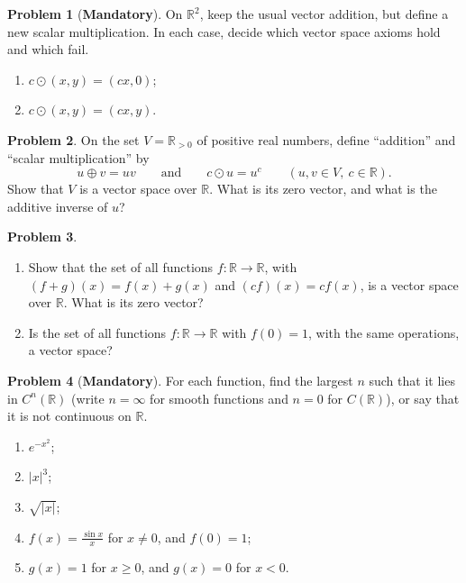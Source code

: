 \documentclass[11pt]{article}
\theoremstyle{definition}
\newtheorem{problem}{Problem}[section]
\newcommand{\mandatory}{\textcolor{red!70!black}{\textbf{Mandatory}}}
\begin{document}
\begin{problem}[\mandatory]\label{pr:weird-ops}
    On $\mathbb{R}^2$, keep the usual vector addition, but define a new scalar multiplication. In each case, decide which vector space axioms hold and which fail.
    \begin{enumerate}[label=(\alph*)]
        \item $c \odot (x, y) = (cx, 0)$;
        \item $c \odot (x, y) = (cx, y)$.
    \end{enumerate}
\end{problem}

\begin{problem}\label{pr:positive-reals}
    On the set $V = \mathbb{R}_{>0}$ of positive real numbers, define ``addition'' and ``scalar multiplication'' by
    \[u \oplus v = uv \qquad \text{and} \qquad c \odot u = u^c \qquad (u, v \in V, \ c \in \mathbb{R}).\]
    Show that $V$ is a vector space over $\mathbb{R}$. What is its zero vector, and what is the additive inverse of $u$?
\end{problem}

\begin{problem}\label{pr:functions}
    \begin{enumerate}[label=(\alph*)]
        \item Show that the set of all functions $f: \mathbb{R} \to \mathbb{R}$, with $(f + g)(x) = f(x) + g(x)$ and $(cf)(x) = c f(x)$, is a vector space over $\mathbb{R}$. What is its zero vector?
        \item Is the set of all functions $f: \mathbb{R} \to \mathbb{R}$ with $f(0) = 1$, with the same operations, a vector space?
    \end{enumerate}
\end{problem}

\begin{problem}[\mandatory]\label{pr:Cn-membership}
    For each function, find the largest $n$ such that it lies in $C^n(\mathbb{R})$ (write $n = \infty$ for smooth functions and $n = 0$ for $C(\mathbb{R})$), or say that it is not continuous on $\mathbb{R}$.
    \begin{enumerate}[label=(\alph*)]
        \item $e^{-x^2}$;
        \item $|x|^3$;
        \item $\sqrt{|x|}$;
        \item $f(x) = \frac{\sin x}{x}$ for $x \neq 0$, and $f(0) = 1$;
        \item $g(x) = 1$ for $x \geq 0$, and $g(x) = 0$ for $x < 0$.
    \end{enumerate}
\end{problem}
\end{document}
